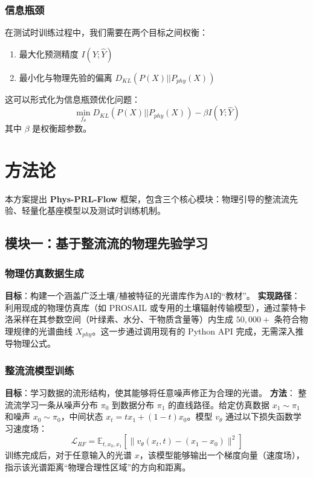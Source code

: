 \documentclass[12pt, a4paper]{article}
\begin{document}
\subsubsection{信息瓶颈}
在测试时训练过程中，我们需要在两个目标之间权衡：
\begin{enumerate}
    \item 最大化预测精度 $I(Y; \hat{Y})$
    \item 最小化与物理先验的偏离 $D_{KL}(P(X) || P_{phy}(X))$
\end{enumerate}
这可以形式化为信息瓶颈优化问题：
\begin{equation}
\min_{f_\theta} D_{KL}(P(X) || P_{phy}(X)) - \beta I(Y; \hat{Y})
\end{equation}
其中 $\beta$ 是权衡超参数。

\newpage
\section{方法论}

本方案提出 \textbf{Phys-PRL-Flow} 框架，包含三个核心模块：物理引导的整流流先验、轻量化基座模型以及测试时训练机制。

\subsection{模块一：基于整流流的物理先验学习}

\subsubsection{物理仿真数据生成}
\textbf{目标}：构建一个涵盖广泛土壤/植被特征的光谱库作为AI的“教材”。
\textbf{实现路径}：
利用现成的物理仿真库（如 PROSAIL 或专用的土壤辐射传输模型），通过蒙特卡洛采样在其参数空间（叶绿素、水分、干物质含量等）内生成 $50,000+$ 条符合物理规律的光谱曲线 $X_{phy}$。这一步通过调用现有的 Python API 完成，无需深入推导物理公式。

\subsubsection{整流流模型训练}
\textbf{目标}：学习数据的流形结构，使其能够将任意噪声修正为合理的光谱。
\textbf{方法}：
整流流学习一条从噪声分布 $\pi_0$ 到数据分布 $\pi_1$ 的直线路径。给定仿真数据 $x_1 \sim \pi_1$ 和噪声 $x_0 \sim \pi_0$，中间状态 $x_t = t x_1 + (1-t) x_0$。模型 $v_\theta$ 通过以下损失函数学习速度场：
\begin{equation}
\mathcal{L}_{RF} = \mathbb{E}_{t, x_0, x_1} \left[ \| v_\theta(x_t, t) - (x_1 - x_0) \|^2 \right]
\end{equation}
训练完成后，对于任意输入的光谱 $x$，该模型能够输出一个梯度向量（速度场），指示该光谱距离“物理合理性区域”的方向和距离。
\end{document}
